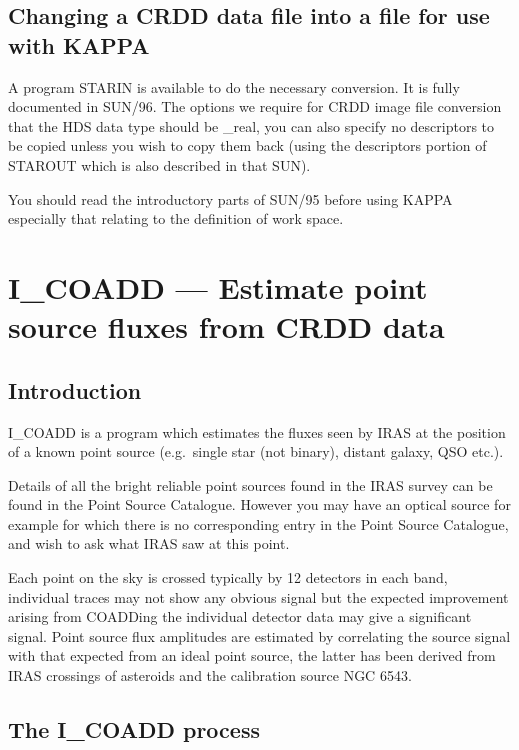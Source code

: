 \subsection{Changing a CRDD data file into a file for use with KAPPA}

A program STARIN is available to do the necessary conversion. It is fully
documented in SUN/96. The options we require for CRDD image file conversion
that the HDS data type should be \_real, you can also specify no descriptors to
be copied unless you wish to copy them back (using the descriptors portion of
STAROUT which is also described in that SUN).

You should read the introductory parts of SUN/95 before using KAPPA especially
that relating to the definition of work space.

\pagebreak

\section{I\_COADD --- Estimate point source fluxes from CRDD data}

\subsection{Introduction}

I\_COADD is a program which estimates the fluxes seen by IRAS at the position
of a known point source (e.g.\ single star (not binary), distant galaxy, QSO
etc.).

Details of all the bright reliable point sources found in the IRAS survey can
be found in the Point Source Catalogue. However you may have an optical source
for example for which there is no corresponding entry in the Point Source
Catalogue, and wish to ask what IRAS saw at this point.


Each point on the sky is crossed typically by 12 detectors in each band,
individual traces may not show any obvious signal but the expected improvement
arising from COADDing the individual detector data may give a significant
signal. Point source flux amplitudes are estimated by correlating the source
signal with that expected from an ideal point source, the latter has been
derived from IRAS crossings of asteroids and the calibration source NGC 6543.

\subsection{The I\_COADD process}

